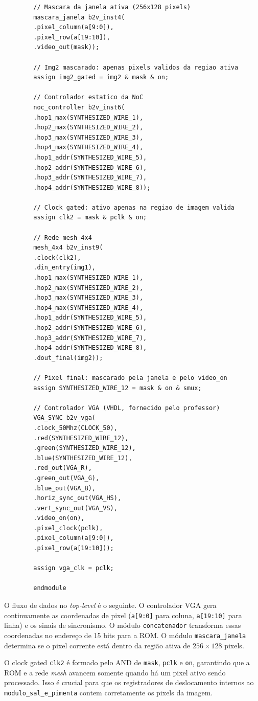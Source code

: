 \documentclass[12pt, a4paper]{article}
\begin{document}
\begin{lstlisting}
		// Mascara da janela ativa (256x128 pixels)
		mascara_janela b2v_inst4(
		.pixel_column(a[9:0]),
		.pixel_row(a[19:10]),
		.video_out(mask));
		
		// Img2 mascarado: apenas pixels validos da regiao ativa
		assign img2_gated = img2 & mask & on;
		
		// Controlador estatico da NoC
		noc_controller b2v_inst6(
		.hop1_max(SYNTHESIZED_WIRE_1),
		.hop2_max(SYNTHESIZED_WIRE_2),
		.hop3_max(SYNTHESIZED_WIRE_3),
		.hop4_max(SYNTHESIZED_WIRE_4),
		.hop1_addr(SYNTHESIZED_WIRE_5),
		.hop2_addr(SYNTHESIZED_WIRE_6),
		.hop3_addr(SYNTHESIZED_WIRE_7),
		.hop4_addr(SYNTHESIZED_WIRE_8));
		
		// Clock gated: ativo apenas na regiao de imagem valida
		assign clk2 = mask & pclk & on;
		
		// Rede mesh 4x4
		mesh_4x4 b2v_inst9(
		.clock(clk2),
		.din_entry(img1),
		.hop1_max(SYNTHESIZED_WIRE_1),
		.hop2_max(SYNTHESIZED_WIRE_2),
		.hop3_max(SYNTHESIZED_WIRE_3),
		.hop4_max(SYNTHESIZED_WIRE_4),
		.hop1_addr(SYNTHESIZED_WIRE_5),
		.hop2_addr(SYNTHESIZED_WIRE_6),
		.hop3_addr(SYNTHESIZED_WIRE_7),
		.hop4_addr(SYNTHESIZED_WIRE_8),
		.dout_final(img2));
		
		// Pixel final: mascarado pela janela e pelo video_on
		assign SYNTHESIZED_WIRE_12 = mask & on & smux;
		
		// Controlador VGA (VHDL, fornecido pelo professor)
		VGA_SYNC b2v_vga(
		.clock_50Mhz(CLOCK_50),
		.red(SYNTHESIZED_WIRE_12),
		.green(SYNTHESIZED_WIRE_12),
		.blue(SYNTHESIZED_WIRE_12),
		.red_out(VGA_R),
		.green_out(VGA_G),
		.blue_out(VGA_B),
		.horiz_sync_out(VGA_HS),
		.vert_sync_out(VGA_VS),
		.video_on(on),
		.pixel_clock(pclk),
		.pixel_column(a[9:0]),
		.pixel_row(a[19:10]));
		
		assign vga_clk = pclk;
		
		endmodule
	\end{lstlisting}
	
	O fluxo de dados no \textit{top-level} é o seguinte. O controlador VGA gera
	continuamente as coordenadas de pixel (\texttt{a[9:0]} para coluna,
	\texttt{a[19:10]} para linha) e os sinais de sincronismo. O módulo
	\texttt{concatenador} transforma essas coordenadas no endereço de 15 bits
	para a ROM. O módulo \texttt{mascara\_janela} determina se o pixel corrente
	está dentro da região ativa de $256\times128$ pixels.
	
	O clock gated \texttt{clk2} é formado pelo AND de \texttt{mask}, \texttt{pclk}
	e \texttt{on}, garantindo que a ROM e a rede \textit{mesh} avancem somente
	quando há um pixel ativo sendo processado. Isso é crucial para que os
	registradores de deslocamento internos ao \texttt{modulo\_sal\_e\_pimenta}
	contem corretamente os pixels da imagem.
	
\end{document}
